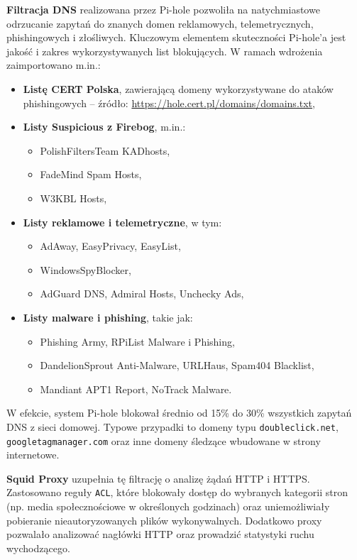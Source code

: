 \documentclass[
    left=2.5cm,         %
    right=2.5cm,        %
    top=2.5cm,          %
    bottom=3cm,         %
    bindingoffset=6mm,  %
    nohyphenation=true %
]{eiti/eiti-thesis} %
\begin{document}
\textbf{Filtracja DNS} realizowana przez Pi-hole pozwoliła na natychmiastowe odrzucanie zapytań do znanych domen reklamowych, telemetrycznych, phishingowych i złośliwych. Kluczowym elementem skuteczności Pi-hole’a jest jakość i zakres wykorzystywanych list blokujących. W ramach wdrożenia zaimportowano m.in.:
\begin{itemize}
    \item \textbf{Listę CERT Polska}, zawierającą domeny wykorzystywane do ataków phishingowych – źródło: \url{https://hole.cert.pl/domains/domains.txt},
    \item \textbf{Listy Suspicious z Firebog}, m.in.:
    \begin{itemize}
        \item PolishFiltersTeam KADhosts,
        \item FadeMind Spam Hosts,
        \item W3KBL Hosts,
    \end{itemize}
    \item \textbf{Listy reklamowe i telemetryczne}, w tym:
    \begin{itemize}
        \item AdAway, EasyPrivacy, EasyList,
        \item WindowsSpyBlocker,
        \item AdGuard DNS, Admiral Hosts, Unchecky Ads,
    \end{itemize}
    \item \textbf{Listy malware i phishing}, takie jak:
    \begin{itemize}
        \item Phishing Army, RPiList Malware i Phishing,
        \item DandelionSprout Anti-Malware, URLHaus, Spam404 Blacklist,
        \item Mandiant APT1 Report, NoTrack Malware.
    \end{itemize}
\end{itemize}

W efekcie, system Pi-hole blokował średnio od 15\% do 30\% wszystkich zapytań DNS z sieci domowej. Typowe przypadki to domeny typu \texttt{doubleclick.net}, \texttt{googletagmanager.com} oraz inne domeny śledzące wbudowane w strony internetowe.

\textbf{Squid Proxy} uzupełnia tę filtrację o analizę żądań HTTP i HTTPS. Zastosowano reguły \texttt{ACL}, które blokowały dostęp do wybranych kategorii stron (np. media społecznościowe w określonych godzinach) oraz uniemożliwiały pobieranie nieautoryzowanych plików wykonywalnych. Dodatkowo proxy pozwalało analizować nagłówki HTTP oraz prowadzić statystyki ruchu wychodzącego.
\end{document}
